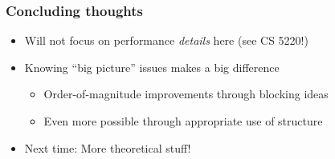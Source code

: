 \documentclass{beamer}
\begin{document}
\begin{frame}
  \frametitle{Concluding thoughts}

  \begin{itemize}
  \item Will not focus on performance {\em details} here (see CS 5220!)
  \item Knowing ``big picture'' issues makes a big difference
    \begin{itemize}
    \item Order-of-magnitude improvements through blocking ideas
    \item Even more possible through appropriate use of structure
    \end{itemize}
  \item Next time: More theoretical stuff!
  \end{itemize}
\end{frame}
\end{document}
